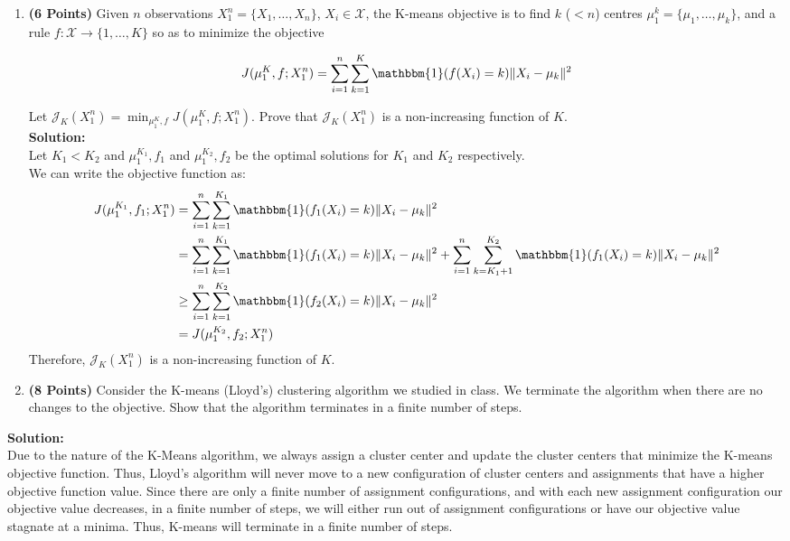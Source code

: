 \documentclass[a4paper]{article}
\newcounter{thm}
\newcommand{\Xcal}{\mathcal{X}}
\newcommand{\Jcal}{\mathcal{J}}
\newcommand{\indfone}{\mathbbm{1}}
\theoremstyle{definition}
\begin{document}
\begin{enumerate}

\item \textbf{(6 Points)}
Given $n$ observations $X_1^n = \{X_1, \dots, X_n\}$, $X_i \in \Xcal$, the K-means objective
is to find $k$
($<n$) centres $\mu_1^k = \{\mu_1, \dots, \mu_k\}$, and a rule $f:\Xcal \rightarrow
\{1,\dots, K\}$ so as to minimize the objective

\begin{equation}
J(\mu_1^K, f; X_1^n) = \sum_{i=1}^n \sum_{k=1}^K \indfone(f(X_i) = k) \|X_i - \mu_k\|^2
\label{eqn:kmeans}
\end{equation}

Let $\Jcal_K(X_1^n) = \min_{\mu_1^K, f} J(\mu_1^K, f; X_1^n)$. Prove that
$\Jcal_{K}(X_1^n)$ is a non-increasing function of $K$.\\

\textbf{Solution: }\\
Let $K_1 < K_2$ and $\mu_1^{K_1}, f_1$ and $\mu_1^{K_2}, f_2$ be the optimal solutions for $K_1$ and $K_2$ respectively.\\
We can write the objective function as:
\begin{align*}
    J(\mu_1^{K_1}, f_1; X_1^n) &= \sum_{i=1}^n \sum_{k=1}^{K_1} \indfone(f_1(X_i) = k) \|X_i - \mu_k\|^2\\
    &= \sum_{i=1}^n \sum_{k=1}^{K_1} \indfone(f_1(X_i) = k) \|X_i - \mu_k\|^2 + \sum_{i=1}^n \sum_{k=K_1+1}^{K_2} \indfone(f_1(X_i) = k) \|X_i - \mu_k\|^2\\
    &\geq \sum_{i=1}^n \sum_{k=1}^{K_2} \indfone(f_2(X_i) = k) \|X_i - \mu_k\|^2\\
    &= J(\mu_1^{K_2}, f_2; X_1^n)
\end{align*}
Therefore, $\Jcal_{K}(X_1^n)$ is a non-increasing function of $K$.

\item \textbf{(8 Points)}
Consider the K-means (Lloyd's) clustering algorithm we studied in class. We
terminate the algorithm when there are no changes to the objective.
Show that the algorithm terminates in a finite number of steps. \\

\end{enumerate}

\textbf{Solution: }\\
Due to the nature of the K-Means algorithm, we always assign a cluster center and update the cluster centers that minimize the K-means objective function. Thus, Lloyd's algorithm will never move to a new configuration of cluster centers and assignments that have a higher objective function value. Since there are only a finite number of assignment configurations, and with each new assignment configuration our objective value decreases, in a finite number of steps, we will either run out of assignment configurations or have our objective value stagnate at a minima. Thus, K-means will terminate in a finite number of steps.
\end{document}
